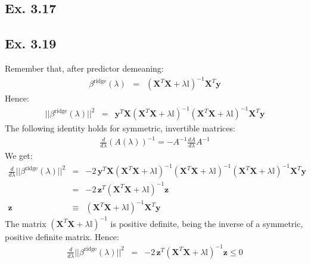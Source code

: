\subsection*{Ex. 3.17}

\subsection*{Ex. 3.19}
Remember that, after predictor demeaning:
\begin{eqnarray*}
\beta^{\textrm{ridge}}(\lambda) & = & \left( \mathbf{X} ^T \mathbf{X} + \lambda \mathbb{I} \right)^{-1} \mathbf{X}^T \mathbf{y}
\end{eqnarray*}
Hence:
\begin{eqnarray*}
||\beta^{\textrm{ridge}}(\lambda)|| ^2 & = & \mathbf{y} ^T \mathbf{X} \left( \mathbf{X} ^T \mathbf{X} + \lambda \mathbb{I} \right)^{-1} \left( \mathbf{X} ^T \mathbf{X} + \lambda \mathbb{I} \right)^{-1} \mathbf{X} ^T \mathbf{y}
\end{eqnarray*}
The following identity holds for symmetric, invertible matrices:
\begin{eqnarray*}
\frac{d}{d \lambda} \left( A(\lambda) \right)^{-1} = - A^{-1} \frac{dA}{d \lambda} A^{-1}
\end{eqnarray*}
We get:
\begin{eqnarray*}
\frac{d}{d \lambda} ||\beta^{\textrm{ridge}}(\lambda)|| ^2 & = & - 2\, \mathbf{y} ^T \mathbf{X} \left( \mathbf{X} ^T \mathbf{X} + \lambda \mathbb{I} \right)^{-1} \left( \mathbf{X} ^T \mathbf{X} + \lambda \mathbb{I} \right)^{-1} \left( \mathbf{X} ^T \mathbf{X} + \lambda \mathbb{I} \right)^{-1} \mathbf{X} ^T \mathbf{y} \\
& = & -2\, \mathbf{z}^T \left( \mathbf{X} ^T \mathbf{X} + \lambda \mathbb{I} \right)^{-1} \mathbf{z} \\
\mathbf{z} & \equiv & \left( \mathbf{X} ^T \mathbf{X} + \lambda \mathbb{I} \right)^{-1} \mathbf{X}^T \mathbf{y} 
\end{eqnarray*}
The matrix $\left( \mathbf{X} ^T \mathbf{X} + \lambda \mathbb{I} \right)^{-1}$ is positive definite, being the inverse of a symmetric, positive definite matrix. Hence:
\begin{eqnarray*}
\frac{d}{d \lambda} ||\beta^{\textrm{ridge}}(\lambda)|| ^2 & = & -2\, \mathbf{z}^T \left( \mathbf{X} ^T \mathbf{X} + \lambda \mathbb{I} \right)^{-1} \mathbf{z} \leq 0
\end{eqnarray*}

